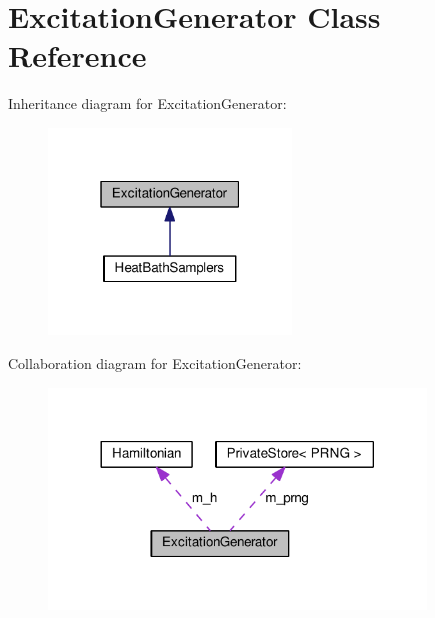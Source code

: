 \hypertarget{classExcitationGenerator}{}\section{Excitation\+Generator Class Reference}
\label{classExcitationGenerator}


Inheritance diagram for Excitation\+Generator\+:
\nopagebreak
\begin{figure}[H]
\begin{center}
\leavevmode
\includegraphics[width=183pt]{classExcitationGenerator__inherit__graph}
\end{center}
\end{figure}


Collaboration diagram for Excitation\+Generator\+:
\nopagebreak
\begin{figure}[H]
\begin{center}
\leavevmode
\includegraphics[width=284pt]{classExcitationGenerator__coll__graph}
\end{center}
\end{figure}
